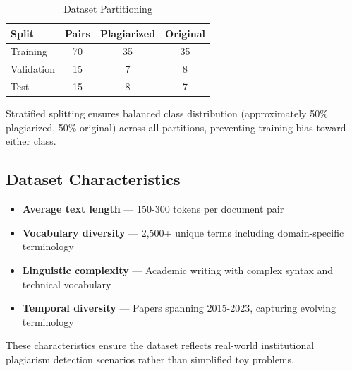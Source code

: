 \begin{table}[h!]
\centering
\caption{Dataset Partitioning}
\label{tab:splits}
\begin{tabular}{|l|c|c|c|}
\hline
\textbf{Split} & \textbf{Pairs} & \textbf{Plagiarized} & \textbf{Original} \\
\hline
Training & 70 & 35 & 35 \\
Validation & 15 & 7 & 8 \\
Test & 15 & 8 & 7 \\
\hline
\end{tabular}
\end{table}

Stratified splitting ensures balanced class distribution (approximately 50\% plagiarized, 50\% original) across all partitions, preventing training bias toward either class.

\subsection{Dataset Characteristics}

\begin{itemize}
  \item \textbf{Average text length} --- 150-300 tokens per document pair
  \item \textbf{Vocabulary diversity} --- 2,500+ unique terms including domain-specific terminology
  \item \textbf{Linguistic complexity} --- Academic writing with complex syntax and technical vocabulary
  \item \textbf{Temporal diversity} --- Papers spanning 2015-2023, capturing evolving terminology
\end{itemize}

These characteristics ensure the dataset reflects real-world institutional plagiarism detection scenarios rather than simplified toy problems.
